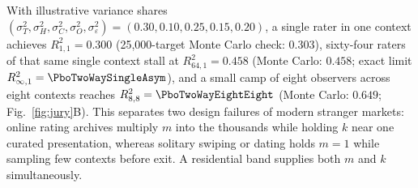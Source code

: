 With illustrative variance shares $(\sigma_T^2,\sigma_H^2,\sigma_C^2,\sigma_O^2,\sigma_\varepsilon^2)=(0.30,0.10,0.25,0.15,0.20)$,
a single rater in one context achieves $R^2_{1,1}=0.300$ (25,000-target Monte Carlo check: $0.303$), sixty-four raters of
that same single context stall at $R^2_{64,1}=0.458$ (Monte Carlo: $0.458$; exact limit $R^2_{\infty,1}=\PboTwoWaySingleAsym$),
and a small camp of eight observers across eight contexts reaches $R^2_{8,8}=\PboTwoWayEightEight$ (Monte Carlo: $0.649$;
Fig.~\ref{fig:jury}B). This separates two design failures of modern stranger markets: online rating archives multiply $m$
into the thousands while holding $k$ near one curated presentation, whereas solitary swiping or dating holds $m=1$ while
sampling few contexts before exit. A residential band supplies both $m$ and $k$ simultaneously.
